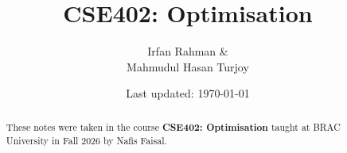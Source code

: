 \documentclass[11pt]{scrreprt}
\begin{document}
\title{CSE402: Optimisation}
\author{Irfan Rahman \&\\ Mahmudul Hasan Turjoy}
\date{Last updated: \today}
\maketitle

\begin{abstract}
	These notes were taken in the course \textbf{CSE402: Optimisation} taught at BRAC University in Fall 2026 by Nafis Faisal.
\end{abstract}

\tableofcontents



\printbibliography[title=References]
\end{document}
